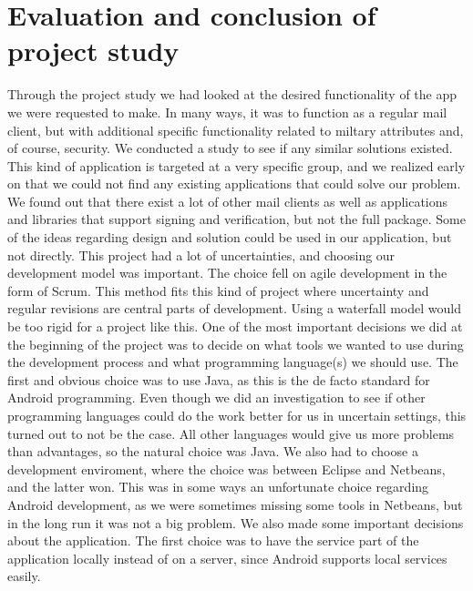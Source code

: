 \pagebreak
\section{Evaluation and conclusion of project study}
Through the project study we had looked at the desired functionality of the app we were requested to make. In many ways, it was to function as a regular mail client, but with additional specific functionality related to miltary attributes and, of course, security. We conducted a study to see if any similar solutions existed. This kind of application is targeted at a very specific group, and we realized early on that we could not find any existing applications that could solve our problem. We found out that there exist a lot of other mail clients as well as applications and libraries that support signing and verification, but not the full package. Some of the ideas regarding design and solution could be used in our application, but not directly.
\newline\newline
This project had a lot of uncertainties, and choosing our development model was important. The choice fell on agile development in the form of Scrum. This method fits this kind of project where uncertainty and regular revisions are central parts of development. Using a waterfall model would be too rigid for a project like this.
\newline\newline
One of the most important decisions we did at the beginning of the project was to decide on what tools we wanted to use during the development process and what programming language(s) we should use. The first and obvious choice was to use Java, as this is the de facto standard for Android programming. Even though we did an investigation to see if other programming languages could do the work better for us in uncertain settings, this turned out to not be the case. All other languages would give us more problems than advantages, so the natural choice was Java. We also had to choose a development enviroment, where the choice was between Eclipse and Netbeans, and the latter won.  This was in some ways an unfortunate choice regarding Android development, as we were sometimes missing some tools in Netbeans, but in the long run it was not a big problem.
\newline\newline
We also made some important decisions about the application. The first choice was to have the service part of the application locally instead of on a server, since Android supports local services easily.
